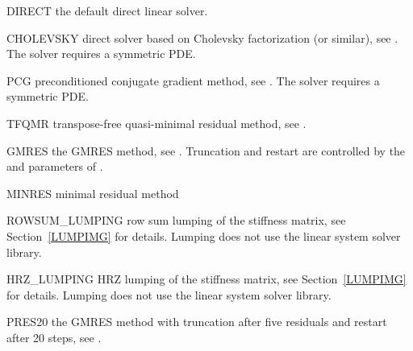 \begin{memberdesc}[SolverOptions]{DIRECT}
the default direct linear solver.
\end{memberdesc}

\begin{memberdesc}[SolverOptions]{CHOLEVSKY}
direct solver based on Cholevsky factorization (or similar), see .
The solver requires a symmetric PDE.
\end{memberdesc}

\begin{memberdesc}[SolverOptions]{PCG}
preconditioned conjugate gradient method, see .
The solver requires a symmetric PDE.
\end{memberdesc}

\begin{memberdesc}[SolverOptions]{TFQMR}
transpose-free quasi-minimal residual method, see .
\end{memberdesc}

\begin{memberdesc}[SolverOptions]{GMRES}
the GMRES method, see .
Truncation and restart are controlled by the  and 
parameters of .
\end{memberdesc}

\begin{memberdesc}[SolverOptions]{MINRES}
minimal residual method
\end{memberdesc}

\begin{memberdesc}[SolverOptions]{ROWSUM_LUMPING}
row sum lumping of the stiffness matrix, see Section~\ref{LUMPIMG} for details.
Lumping does not use the linear system solver library.
\end{memberdesc}

\begin{memberdesc}[SolverOptions]{HRZ_LUMPING}
HRZ lumping of the stiffness matrix, see Section~\ref{LUMPIMG} for details.
Lumping does not use the linear system solver library.
\end{memberdesc}

\begin{memberdesc}[SolverOptions]{PRES20}
the GMRES method with truncation after five residuals and restart after
20 steps, see .
\end{memberdesc}

